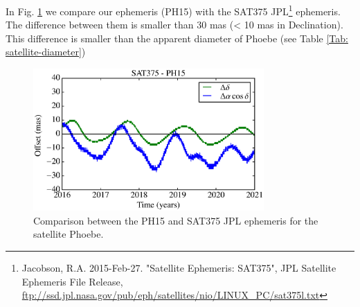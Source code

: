 \documentclass[useAMS,usenatbib]{mn2e}
\begin{document}
In Fig. \ref{Fig:eph-Phoebe} we compare our ephemeris (PH15) with the SAT375 JPL\footnote{Jacobson, R.A. 2015-Feb-27. "Satellite Ephemeris: SAT375", JPL Satellite Ephemeris File Release, \url{ftp://ssd.jpl.nasa.gov/pub/eph/satellites/nio/LINUX_PC/sat375l.txt}} ephemeris. The difference between them is smaller than 30 mas (< 10 mas in Declination). This difference is smaller than the apparent diameter of Phoebe (see Table \ref{Tab: satellite-diameter})

\begin{figure}
\begin{centering}
\includegraphics[width=8.8cm]{figures/Phoebe.eps} 
\caption{Comparison between the PH15 and SAT375 JPL ephemeris for the satellite Phoebe.}
\label{Fig:eph-Phoebe}
\end{centering}
\end{figure}
\end{document}
